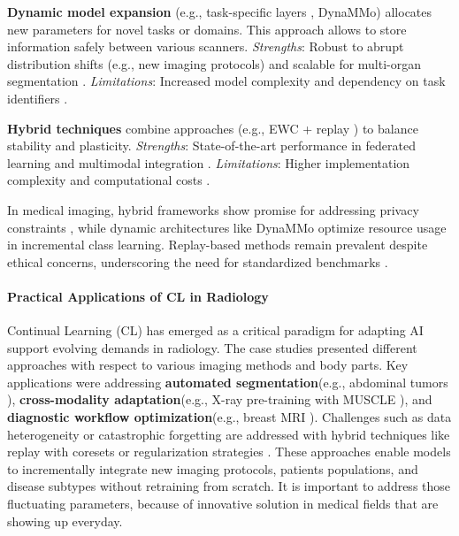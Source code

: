 \documentclass{IEEEcsmag}
\begin{document}
    \textbf{Dynamic model expansion} (e.g., task-specific layers \cite{cite-1}, DynaMMo\cite{cite-17}) allocates new parameters for novel tasks or domains.
    This approach allows to store information safely between various scanners.
    \textit{Strengths}: Robust to abrupt distribution shifts (e.g., new imaging protocols) and scalable for multi-organ segmentation \cite{cite-1}\cite{cite-17}.  
    \textit{Limitations}: Increased model complexity and dependency on task identifiers \cite{cite-11}\cite{cite-17}.
    
    \textbf{Hybrid techniques} combine approaches (e.g., EWC + replay \cite{cite-11}) to balance stability and plasticity.  
    \textit{Strengths}: State-of-the-art performance in federated learning and multimodal integration \cite{cite-11}\cite{cite-2}.
    \textit{Limitations}: Higher implementation complexity and computational costs \cite{cite-17}\cite{cite-11}.
    
    In medical imaging, hybrid frameworks show promise for addressing privacy constraints \cite{cite-11}\cite{cite-2}, while dynamic architectures like DynaMMo \cite{cite-17} optimize resource usage in incremental class learning.
    Replay-based methods remain prevalent despite ethical concerns, underscoring the need for standardized benchmarks \cite{cite-11}\cite{cite-5}.

    \paragraph{Practical Applications of CL in Radiology}
    Continual Learning (CL) has emerged as a critical paradigm for adapting AI support evolving demands in radiology. The case studies presented different approaches with respect to various imaging methods and body parts.
    Key applications were addressing \textbf{automated segmentation}(e.g., abdominal tumors \cite{cite-1}), \textbf{cross-modality adaptation}(e.g., X-ray pre-training with MUSCLE \cite{cite-17}), and \textbf{diagnostic workflow optimization}(e.g., breast MRI \cite{cite-21}).
    Challenges such as data heterogeneity or catastrophic forgetting are addressed with hybrid techniques like replay with coresets \cite{cite-26} or regularization strategies \cite{cite-11}.
    These approaches enable models to incrementally integrate new imaging protocols, patients populations, and disease subtypes without retraining from scratch.
    It is important to address those fluctuating parameters, because of innovative solution in medical fields that are showing up everyday.
\end{document}
